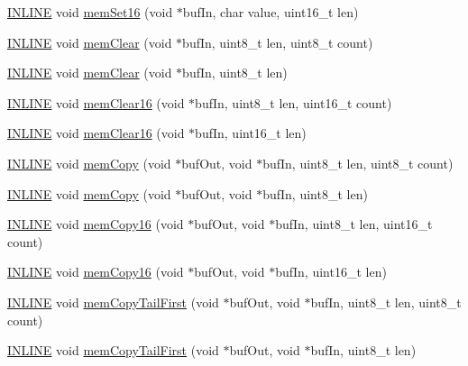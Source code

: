 \begin{DoxyCompactItemize}
\hyperlink{io_8h_a2eb6f9e0395b47b8d5e3eeae4fe0c116}{I\-N\-L\-I\-N\-E} void \hyperlink{namespacemhvlib_aa7d6d322931da1cc3de4a04d7b30cbfe}{mem\-Set16} (void $\ast$buf\-In, char value, uint16\-\_\-t len)
\item 
\hyperlink{io_8h_a2eb6f9e0395b47b8d5e3eeae4fe0c116}{I\-N\-L\-I\-N\-E} void \hyperlink{namespacemhvlib_a5d6286de16c8eb8cf10cef0d6a81ddf6}{mem\-Clear} (void $\ast$buf\-In, uint8\-\_\-t len, uint8\-\_\-t count)
\item 
\hyperlink{io_8h_a2eb6f9e0395b47b8d5e3eeae4fe0c116}{I\-N\-L\-I\-N\-E} void \hyperlink{namespacemhvlib_a4321772216989fdb163d9c5ae89046b0}{mem\-Clear} (void $\ast$buf\-In, uint8\-\_\-t len)
\item 
\hyperlink{io_8h_a2eb6f9e0395b47b8d5e3eeae4fe0c116}{I\-N\-L\-I\-N\-E} void \hyperlink{namespacemhvlib_ab2e9bda999c582b29be6dcf67c31370d}{mem\-Clear16} (void $\ast$buf\-In, uint8\-\_\-t len, uint16\-\_\-t count)
\item 
\hyperlink{io_8h_a2eb6f9e0395b47b8d5e3eeae4fe0c116}{I\-N\-L\-I\-N\-E} void \hyperlink{namespacemhvlib_ad587cd34f1560cb4c1cc66014635ed8f}{mem\-Clear16} (void $\ast$buf\-In, uint16\-\_\-t len)
\item 
\hyperlink{io_8h_a2eb6f9e0395b47b8d5e3eeae4fe0c116}{I\-N\-L\-I\-N\-E} void \hyperlink{namespacemhvlib_a39bea1804064b2d58fcd8a6f1a4512a2}{mem\-Copy} (void $\ast$buf\-Out, void $\ast$buf\-In, uint8\-\_\-t len, uint8\-\_\-t count)
\item 
\hyperlink{io_8h_a2eb6f9e0395b47b8d5e3eeae4fe0c116}{I\-N\-L\-I\-N\-E} void \hyperlink{namespacemhvlib_a841dfdab3ba859a1dffb32bb28c93c85}{mem\-Copy} (void $\ast$buf\-Out, void $\ast$buf\-In, uint8\-\_\-t len)
\item 
\hyperlink{io_8h_a2eb6f9e0395b47b8d5e3eeae4fe0c116}{I\-N\-L\-I\-N\-E} void \hyperlink{namespacemhvlib_a3b391a337d0de771a247b949390d8260}{mem\-Copy16} (void $\ast$buf\-Out, void $\ast$buf\-In, uint8\-\_\-t len, uint16\-\_\-t count)
\item 
\hyperlink{io_8h_a2eb6f9e0395b47b8d5e3eeae4fe0c116}{I\-N\-L\-I\-N\-E} void \hyperlink{namespacemhvlib_a929234851088212c74830570ca228c07}{mem\-Copy16} (void $\ast$buf\-Out, void $\ast$buf\-In, uint16\-\_\-t len)
\item 
\hyperlink{io_8h_a2eb6f9e0395b47b8d5e3eeae4fe0c116}{I\-N\-L\-I\-N\-E} void \hyperlink{namespacemhvlib_a35668afc06c28017cf48f26fce5eda9a}{mem\-Copy\-Tail\-First} (void $\ast$buf\-Out, void $\ast$buf\-In, uint8\-\_\-t len, uint8\-\_\-t count)
\item 
\hyperlink{io_8h_a2eb6f9e0395b47b8d5e3eeae4fe0c116}{I\-N\-L\-I\-N\-E} void \hyperlink{namespacemhvlib_a3624e079631f7d1b721d4e5a997824ec}{mem\-Copy\-Tail\-First} (void $\ast$buf\-Out, void $\ast$buf\-In, uint8\-\_\-t len)

\end{DoxyCompactItemize}
